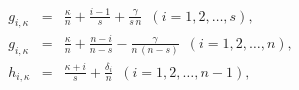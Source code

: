 \begin{equation}
\begin{array}{rcl}
g_{i,\kappa}&=&\frac{\kappa}{n}+\frac{i-1}{s}+\frac{\gamma}{s\,n}
\,\,\, (i=1,2,\dots,s),\\
g_{i,\kappa}&=&\frac{\kappa}{n}+\frac{n-i}{n-s}-\frac{\gamma}{n\,(n-s)}
\,\,\, (i=1,2,\dots,n),\\
h_{i,\kappa}&=&\frac{\kappa+i}{s}+\frac{\delta_{i}}{n} \,\,\, (i=1,
2,\dots,n-1),
\end{array}
\end{equation}

